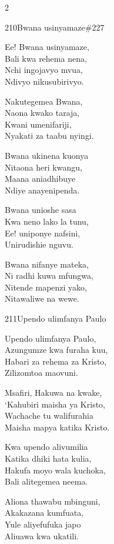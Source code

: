 \begin{multicols}{2}
\begin{hymn}{210}{Bwana usinyamaze}{\#227}
\begin{stanza}
Ee! Bwana usinyamaze,\\
Bali kwa rehema nena,\\
Nchi ingojavyo mvua,\\
Ndivyo nikusubirivyo.
\end{stanza}
\begin{chorus}
Nakutegemea Bwana,\\
Naona kwako taraja,\\
Kwani umenifariji,\\
Nyakati za taabu nyingi.
\end{chorus}
\begin{stanza}
Bwana ukinena kuonya\\
Nitaona heri kwangu,\\
Maana aniadhibuye\\
Ndiye anayenipenda.
\end{stanza}
\begin{stanza}
Bwana unioshe sasa\\
Kwa neno lako la tunu,\\
Ee! uniponye nafsini,\\
Unirudishie nguvu.
\end{stanza}
\begin{stanza}
Bwana nifanye mateka,\\
Ni radhi kuwa mfungwa,\\
Nitende mapenzi yako,\\
Nitawaliwe na wewe.
\end{stanza}
\end{hymn}

\begin{hymn}{211}{Upendo ulimfanya Paulo}{}
\begin{stanza}
Upendo ulimfanya Paulo,\\
Azungumze kwa furaha kuu,\\
Habari za rehema za Kristo,\\
Zilizomtoa maovuni.
\end{stanza}
\begin{stanza}
Msafiri, Hakuwa na kwake,\\
`Kahubiri maisha ya Kristo,\\
Wachache tu walifurahia\\
Maisha mapya katika Kristo.
\end{stanza}
\begin{stanza}
Kwa upendo alivumilia\\
Katika dhiki hata kulia,\\
Hakufa moyo wala kuchoka,\\
Bali alitegemea neema.
\end{stanza}
\begin{stanza}
Aliona thawabu mbinguni,\\
Akakazana kumfuata,\\
Yule aliyefufuka japo\\
Aliuawa kwa ukatili.
\end{stanza}
\end{hymn}


\end{multicols}
